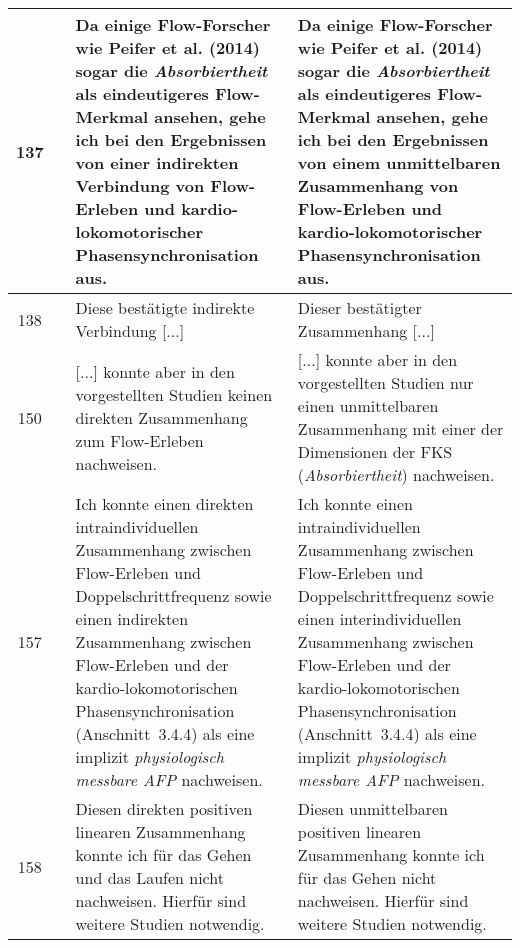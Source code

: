 \documentclass[12pt, twoside=semi, DIV=calc, pagesize, parskip=half, listof=totoc, bibliography=totoc, open=right, listof=nochaptergap, pointlessnumbers, final]{scrreprt}
\begin{document}
\begin{tabularx}{\textwidth}{|c|c|X|X|}
		\hline
		137 & & Da einige Flow-Forscher wie Peifer et al. (2014) sogar die \emph{Absorbiertheit} als eindeutigeres Flow-Merkmal ansehen, gehe ich bei den Ergebnissen von einer indirekten Verbindung von Flow-Erleben und kardio-lokomotorischer Phasensynchronisation aus. & Da einige Flow-Forscher wie Peifer et al. (2014) sogar die \emph{Absorbiertheit} als eindeutigeres Flow-Merkmal ansehen, gehe ich bei den Ergebnissen von einem unmittelbaren Zusammenhang von Flow-Erleben und kardio-lokomotorischer Phasensynchronisation aus.\\
		\hline 
		138 & & Diese bestätigte indirekte Verbindung [...] & Dieser bestätigter Zusammenhang [...]\\
		\hline
		150 & &  [...] konnte aber in den vorgestellten Studien keinen direkten Zusammenhang zum Flow-Erleben nachweisen. & [...] konnte aber in den vorgestellten Studien nur einen unmittelbaren Zusammenhang mit einer der Dimensionen der FKS (\emph{Absorbiertheit}) nachweisen.\\
		\hline 
		157 & & Ich konnte einen direkten intraindividuellen Zusammenhang zwischen Flow-Erleben und Doppelschrittfrequenz sowie einen indirekten Zusammenhang zwischen Flow-Erleben und der kardio-lokomotorischen Phasensynchronisation (Anschnitt~3.4.4) als eine implizit \emph{physiologisch messbare AFP} nachweisen. & Ich konnte einen intraindividuellen Zusammenhang zwischen Flow-Erleben und Doppelschrittfrequenz sowie einen interindividuellen Zusammenhang zwischen Flow-Erleben und der kardio-lokomotorischen Phasensynchronisation (Anschnitt~3.4.4) als eine implizit \emph{physiologisch messbare AFP} nachweisen.\\
		\hline
		158 & & Diesen direkten positiven linearen Zusammenhang konnte ich für das Gehen und das Laufen nicht nachweisen. Hierfür sind weitere Studien notwendig. & Diesen unmittelbaren positiven linearen Zusammenhang konnte ich für das Gehen nicht nachweisen. Hierfür sind weitere Studien notwendig.\\
		
		\hline
	\end{tabularx}

\setcounter{chapter}{5}
\setcounter{table}{6}
\end{document}
